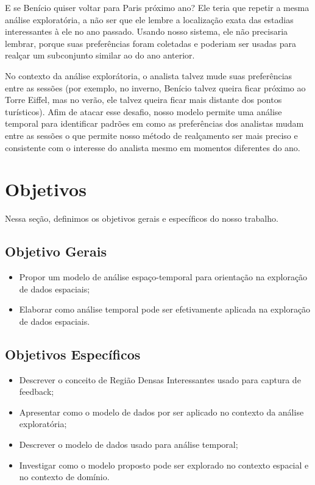 E se Benício quiser voltar para Paris próximo ano? Ele teria que repetir a mesma análise exploratória, a não ser que ele lembre a localização exata das estadias interessantes à ele no ano passado. Usando nosso sistema, ele não precisaria lembrar, porque suas preferências foram coletadas e poderiam ser usadas para realçar um subconjunto similar ao do ano anterior.

No contexto da análise explorátoria, o analista talvez mude suas preferências entre as sessões (por exemplo, no inverno, Benício talvez queira ficar próximo ao Torre Eiffel, mas no verão, ele talvez queira ficar mais distante dos pontos turísticos). Afim de atacar esse desafio, nosso modelo permite uma análise temporal para identificar padrões em como as preferências dos analistas mudam entre as sessões o que permite nosso método de realçamento ser mais preciso e consistente com o interesse do analista mesmo em momentos diferentes do ano.

\section{Objetivos}

Nessa seção, definimos os objetivos gerais e específicos do nosso trabalho.

\subsection{Objetivo Gerais}

\begin{itemize}
	\item Propor um modelo de análise espaço-temporal para orientação na exploração de dados espaciais;
	\item Elaborar como análise temporal pode ser efetivamente aplicada na exploração de dados espaciais.
\end{itemize}

\subsection{Objetivos Específicos}

\begin{itemize}
	\item Descrever o conceito de Região Densas Interessantes usado para captura de feedback;
	\item Apresentar como o modelo de dados por ser aplicado no contexto da análise exploratória;
	\item Descrever o modelo de dados usado para análise temporal;
	\item Investigar como o modelo proposto pode ser explorado no contexto espacial e no contexto de domínio.
\end{itemize}


